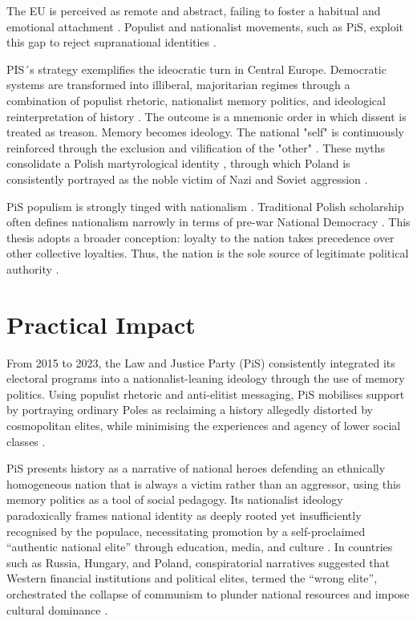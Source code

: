 The EU is perceived as remote and abstract, failing to foster a habitual and emotional attachment \citep{jamieson_theorising_2002}. Populist and nationalist movements, such as PiS, exploit this gap to reject supranational identities \citep{jamieson_theorising_2002}.

PIS´s strategy exemplifies the ideocratic turn in Central Europe. Democratic systems are transformed into illiberal, majoritarian regimes through a combination of populist rhetoric, nationalist memory politics, and ideological reinterpretation of history \citep{rupnik_crisis_2018}. The outcome is a mnemonic order in which dissent is treated as treason. Memory becomes ideology. The national "self" is continuously reinforced through the exclusion and vilification of the "other" \citep{mazzini_three-dimensional_2018}. These myths consolidate a Polish martyrological identity \citep{meijen_populist_2024}, through which Poland is consistently portrayed as the noble victim of Nazi and Soviet aggression \citep{gliszczynska_grabias_memory_2014}.

PiS populism is strongly tinged with nationalism \citep{brubaker_populism_2020}. Traditional Polish scholarship often defines nationalism narrowly in terms of pre-war National Democracy \citep{cordell_transformation_2015}. This thesis adopts a broader conception: loyalty to the nation takes precedence over other collective loyalties. Thus, the nation is the sole source of legitimate political authority \citep{jaskulowski_populist_2023}.


\section{Practical Impact}

From 2015 to 2023, the Law and Justice Party (PiS) consistently integrated its electoral programs into a nationalist-leaning ideology through the use of memory politics. Using populist rhetoric and anti-elitist messaging, PiS mobilises support by portraying ordinary Poles as reclaiming a history allegedly distorted by cosmopolitan elites, while minimising the experiences and agency of lower social classes \citep{jaskulowski_populist_2023}.

PiS presents history as a narrative of national heroes defending an ethnically homogeneous nation that is always a victim rather than an aggressor, using this memory politics as a tool of social pedagogy. Its nationalist ideology paradoxically frames national identity as deeply rooted yet insufficiently recognised by the populace, necessitating promotion by a self-proclaimed “authentic national elite” through education, media, and culture \citep{jaskulowski_populist_2023}. In countries such as Russia, Hungary, and Poland, conspiratorial narratives suggested that Western financial institutions and political elites, termed the “wrong elite”,  orchestrated the collapse of communism to plunder national resources and impose cultural dominance \citep{bergmann_strategic_2025}.

